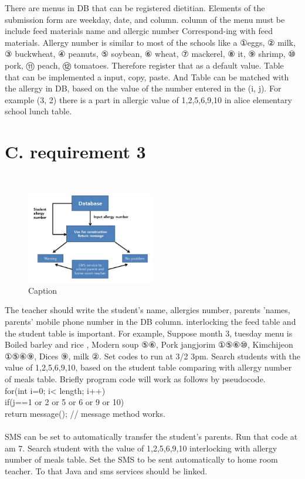 \documentclass[a4paper,11pt]{IEEEtran}
\begin{document}
{There are menus in DB that can be registered dietitian. Elements of the submission form are weekday, date, and column.  column of the menu must be include feed materials name and allergic number Correspond-ing with feed materials. Allergy number is similar to most of the schools like a ①eggs, ② milk, ③ buckwheat, ④ peanuts, ⑤ soybean, ⑥ wheat, ⑦ mackerel, ⑧ it, ⑨ shrimp, ⑩ pork, ⑪ peach, ⑫ tomatoes. Therefore register that as a default value. Table that can be implemented a input, copy, paste. And Table can be matched with the allergy in DB, based on the value of the number entered in the (i, j).
For example (3, 2) there is a part in allergic value of 1,2,5,6,9,10 in alice elementary school lunch table.
~\\
\section*{C. requirement 3}
~\\
\begin{figure}[!h]
        \centering
        \includegraphics[width=0.5\textwidth, height=0.5\textheight]{r3.jpg}
        \caption{Caption}
        \label{fig1}
\end{figure}

The teacher should write the student's name, allergies number, parents 'names, parents' mobile phone number in the DB column. interlocking the feed table and the student table is important. For example, Suppose month 3, tuesday menu is Boiled barley and rice , Modern soup ⑤⑥, Pork jangjorim ①⑤⑥⑩, Kimchijeon ①⑤⑥⑨, Dices ⑨, milk ②. Set codes to run at 3/2 3pm. 
Search students with the value of 1,2,5,6,9,10, based on the student table comparing with allergy number of meals table. Briefly program code will work as follows by pseudocode.\\

for(int i=0; i< length; i++)\\
{ if(j==1 or 2 or 5 or 6 or 9 or 10) \\
return message(); // message method works.\\
}\\
SMS can be set to automatically transfer the student's parents. Run that code at am 7. Search student with the value of 1,2,5,6,9,10 interlocking with allergy number of meals table. Set the SMS to be sent automatically to home room teacher. To that Java and sms services should be linked.
~\\
}
\end{document}
